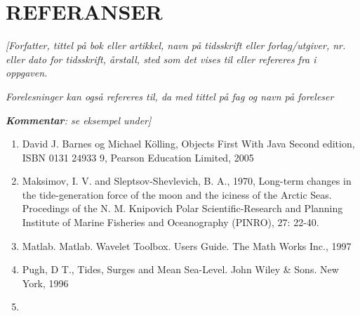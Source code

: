\documentclass[../main.tex]{subfiles}
\begin{document}
\section{REFERANSER}

\bigskip

{\itshape\color{blue}
[Forfatter, tittel p{\aa} bok eller artikkel, navn p{\aa} tidsskrift eller forlag/utgiver, nr. eller dato for
tidsskrift, {\aa}rstall, sted som det vises til eller refereres fra i oppgaven.}

{\itshape\color{blue}
Forelesninger kan ogs{\aa} refereres til, da med tittel p{\aa} fag og navn p{\aa} foreleser}

{\itshape\color{blue}
\textbf{\textup{Kommentar}}: se eksempel under]}


\bigskip

\liststyleWWviiiNumxiii
\begin{enumerate}
\item {
David J. Barnes og Michael K\"olling, Objects First With Java Second edition, \newline
ISBN 0131 24933 9, Pearson Education Limited, 2005}
\item {
Maksimov, I. V. and Sleptsov-Shevlevich, B. A., 1970, Long-term changes in the tide-generation force of the moon and the
iciness of the Arctic Seas. Procedings of the N. M. Knipovich Polar Scientific-Research and Planning Institute of
Marine Fisheries and Oceanography (PINRO), 27: 22-40.}
\item {
Matlab. Matlab. Wavelet Toolbox. Users Guide. The Math Works Inc., 1997}
\item {
Pugh, D T., Tides, Surges and Mean Sea-Level. John Wiley \& Sons. New York, 1996}
\item 
\bigskip
\end{enumerate}

\bigskip
\end{document}
